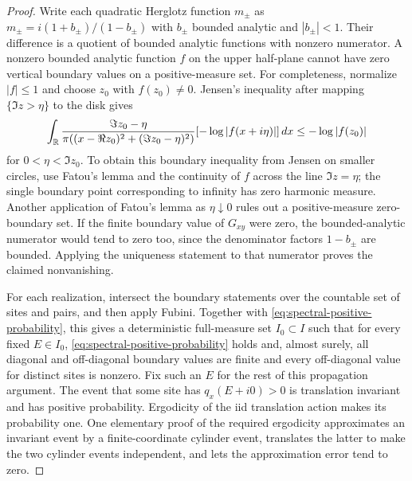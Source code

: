 \begin{proof}
Write each quadratic Herglotz function $m_\pm$ as
$m_\pm=i(1+b_\pm)/(1-b_\pm)$ with $b_\pm$ bounded analytic
and $|b_\pm|<1$. Their difference is a quotient of bounded
analytic functions with nonzero numerator. A nonzero bounded
analytic function $f$ on the upper half-plane cannot have zero
vertical boundary values on a positive-measure set. For
completeness, normalize $|f|\le1$ and choose $z_0$ with
$f(z_0)\ne0$. Jensen's inequality after mapping
$\{\Im z>\eta\}$ to the disk gives
\[
 \int_{\mathbb R}\frac{\Im z_0-\eta}
 {\pi((x-\Re z_0)^2+(\Im z_0-\eta)^2)}
       [-\log|f(x+i\eta)|]\,dx
 \le-\log|f(z_0)|
\]
for $0<\eta<\Im z_0$. To obtain this boundary inequality from
Jensen on smaller circles, use Fatou's lemma and the continuity
of $f$ across the line $\Im z=\eta$; the single boundary point
corresponding to infinity has zero harmonic measure.
Another application of Fatou's lemma as $\eta\downarrow0$
rules out a positive-measure zero-boundary set. If the finite
boundary value of $G_{xy}$ were zero, the bounded-analytic
numerator would tend to zero too, since the denominator factors
$1-b_\pm$ are bounded. Applying the uniqueness statement to
that numerator proves the claimed nonvanishing.

For each realization, intersect the boundary statements over the
countable set of sites and pairs, and then apply Fubini. Together
with \eqref{eq:spectral-positive-probability}, this gives a deterministic
full-measure set $I_0\subset I$ such that for every fixed $E\in I_0$,
\eqref{eq:spectral-positive-probability} holds and, almost surely, all
diagonal and off-diagonal boundary values are finite and every
off-diagonal value for distinct sites is nonzero. Fix such an $E$
for the rest of this propagation argument. The event that some site
has $q_x(E+i0)>0$ is translation invariant and has positive
probability. Ergodicity of the iid translation action makes its
probability one. One elementary proof of the required ergodicity
approximates an invariant event by a finite-coordinate cylinder
event, translates the latter to make the two cylinder events
independent, and lets the approximation error tend to zero.


\end{proof}
